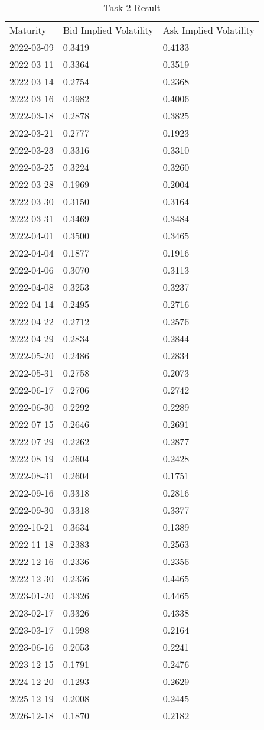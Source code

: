 \begin{table}
\centering
\caption{Task 2 Result}
\label{tab:task2}
\begin{tabular}{l l l}   
Maturity & Bid Implied Volatility & Ask Implied Volatility \\
2022-03-09 & 0.3419 & 0.4133 \\
2022-03-11 & 0.3364 & 0.3519 \\
2022-03-14 & 0.2754 & 0.2368 \\
2022-03-16 & 0.3982 & 0.4006 \\
2022-03-18 & 0.2878 & 0.3825 \\
2022-03-21 & 0.2777 & 0.1923 \\
2022-03-23 & 0.3316 & 0.3310 \\
2022-03-25 & 0.3224 & 0.3260 \\
2022-03-28 & 0.1969 & 0.2004 \\
2022-03-30 & 0.3150 & 0.3164 \\
2022-03-31 & 0.3469 & 0.3484 \\
2022-04-01 & 0.3500 & 0.3465 \\
2022-04-04 & 0.1877 & 0.1916 \\
2022-04-06 & 0.3070 & 0.3113 \\
2022-04-08 & 0.3253 & 0.3237 \\
2022-04-14 & 0.2495 & 0.2716 \\
2022-04-22 & 0.2712 & 0.2576 \\
2022-04-29 & 0.2834 & 0.2844 \\
2022-05-20 & 0.2486 & 0.2834 \\
2022-05-31 & 0.2758 & 0.2073 \\
2022-06-17 & 0.2706 & 0.2742 \\
2022-06-30 & 0.2292 & 0.2289 \\
2022-07-15 & 0.2646 & 0.2691 \\
2022-07-29 & 0.2262 & 0.2877 \\
2022-08-19 & 0.2604 & 0.2428 \\
2022-08-31 & 0.2604 & 0.1751 \\
2022-09-16 & 0.3318 & 0.2816 \\
2022-09-30 & 0.3318 & 0.3377 \\
2022-10-21 & 0.3634 & 0.1389 \\
2022-11-18 & 0.2383 & 0.2563 \\
2022-12-16 & 0.2336 & 0.2356 \\
2022-12-30 & 0.2336 & 0.4465 \\
2023-01-20 & 0.3326 & 0.4465 \\
2023-02-17 & 0.3326 & 0.4338 \\
2023-03-17 & 0.1998 & 0.2164 \\
2023-06-16 & 0.2053 & 0.2241 \\
2023-12-15 & 0.1791 & 0.2476 \\
2024-12-20 & 0.1293 & 0.2629 \\
2025-12-19 & 0.2008 & 0.2445 \\
2026-12-18 & 0.1870 & 0.2182 \\

\end{tabular}

\end{table}


